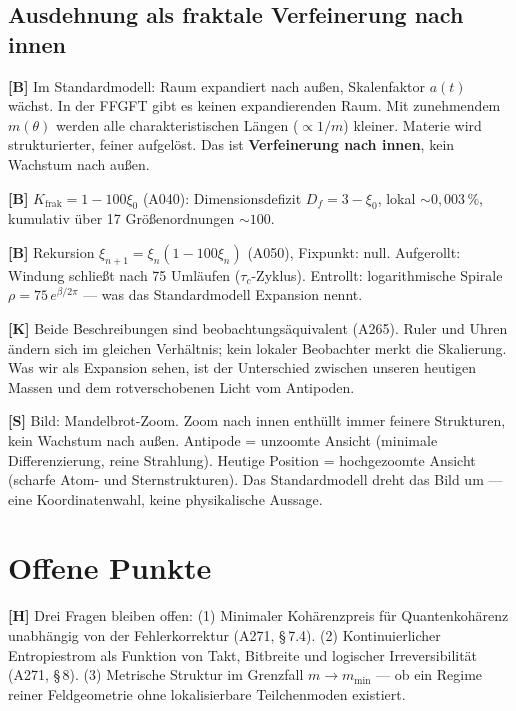 \subsection{Ausdehnung als fraktale Verfeinerung nach innen}

\textbf{[B]} Im Standardmodell: Raum expandiert nach außen,
Skalenfaktor $a(t)$ wächst. In der FFGFT gibt es keinen expandierenden
Raum. Mit zunehmendem $m(\theta)$ werden alle charakteristischen
Längen ($\propto 1/m$) kleiner. Materie wird strukturierter, feiner
aufgelöst. Das ist \textbf{Verfeinerung nach innen}, kein Wachstum
nach außen.

\textbf{[B]} $K_\text{frak} = 1-100\xi_0$ (A040): Dimensionsdefizit
$D_f = 3-\xi_0$, lokal $\sim 0{,}003\,\%$, kumulativ über 17
Größenordnungen $\sim 100$.

\textbf{[B]} Rekursion $\xi_{n+1} = \xi_n(1-100\xi_n)$ (A050),
Fixpunkt: null. Aufgerollt: Windung schließt nach 75 Umläufen
($\tau_c$-Zyklus). Entrollt: logarithmische Spirale
$\rho = 75\,e^{\beta/2\pi}$ --- was das Standardmodell Expansion nennt.

\textbf{[K]} Beide Beschreibungen sind beobachtungsäquivalent (A265).
Ruler und Uhren ändern sich im gleichen Verhältnis; kein lokaler
Beobachter merkt die Skalierung. Was wir als Expansion sehen, ist der
Unterschied zwischen unseren heutigen Massen und dem rotverschobenen
Licht vom Antipoden.

\textbf{[S]} Bild: Mandelbrot-Zoom. Zoom nach innen enthüllt immer
feinere Strukturen, kein Wachstum nach außen. Antipode = unzoomte
Ansicht (minimale Differenzierung, reine Strahlung). Heutige Position
= hochgezoomte Ansicht (scharfe Atom- und Sternstrukturen).
Das Standardmodell dreht das Bild um --- eine Koordinatenwahl,
keine physikalische Aussage.

\section{Offene Punkte}

\textbf{[H]} Drei Fragen bleiben offen:
(1) Minimaler Kohärenzpreis für Quantenkohärenz unabhängig von der
Fehlerkorrektur (A271, §\,7.4).
(2) Kontinuierlicher Entropiestrom als Funktion von Takt, Bitbreite
und logischer Irreversibilität (A271, §\,8).
(3) Metrische Struktur im Grenzfall $m \to m_\text{min}$ --- ob
ein Regime reiner Feldgeometrie ohne lokalisierbare Teilchenmoden
existiert.

